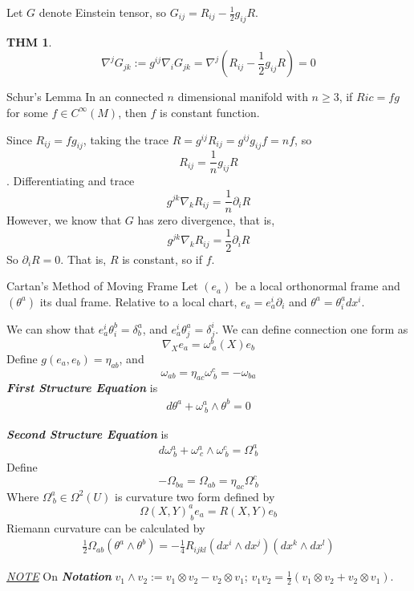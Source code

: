 \documentclass[twocolumn]{article}
\renewcommand{\emph}[1]{\textbf{\textit{#1}}}
\newcommand{\n}{\nabla}
\newcommand{\C}{C^{\infty}}
\newcommand{\p}{\partial}
\newcommand{\N}{\textit{\underline{NOTE} }}
\newcommand{\W}{\Omega}
\newtheorem{thm}{THM}
\theoremstyle{definition}
\begin{document}
Let $G$ denote Einstein tensor, so $G_{ij} = R_{ij} - \frac{1}{2}g_{ij}R$.

\begin{thm}
	$$
\n ^{j} G_{jk} := g^{ij}\n_{i} G_{jk} = \n^j(R_{ij} - \frac{1}{2}g_{ij}R)= 0
	$$
\end{thm}

\begin{eg}{Schur's Lemma}{}
	In an connected $n$ dimensional manifold with $n \geq 3$, if $Ric = fg$ for some $f \in \C(M)$, then $f$ is constant function.

	\tcblower
	Since $R_{ij} = fg_{ij}$, taking the trace $R = g^{ij}R_{ij} = g^{ij}g_{ij}f = nf$, so 
	$$R_{ij} = \frac{1}{n} g_{ij} R$$.
	Differentiating and trace 
	$$
		g^{jk} \n_{k}R_{ij} = \frac{1}{n} \p_i R 
	$$
	However, we know that $G$ has zero divergence, that is, 
	$$
		g^{jk} \n_{k}R_{ij} = \frac{1}{2} \p_i R 
	$$
	So $\p_i R = 0$. That is, $R$ is constant, so if $f$.
\end{eg}

\begin{fthm}{Cartan's Method of Moving Frame}{}
	Let $(e_a)$ be a local orthonormal frame and $(\theta ^a)$ its dual frame.
	Relative to a local chart, $e_a = e^i_a \p_i$ and $\theta^a = \theta^a_i dx^i$.

	We can show that $e^i_a \theta^b_i = \delta^a_b$, and $e^i_a \theta^a_j = \delta^i_j$.
	We can define connection one form as 
	$$
	\n_X e_a= \omega^b_{\ a}(X) e_b
	$$
	Define $g(e_a, e_b) = \eta_{ab}$, and 
	$$
	\omega_{ab} = \eta_{ac} \omega^c_{\ b} = - \omega_{ba}
	$$
	\emph{First Structure Equation} is
	\begin{align}
		d \theta^a + \omega^a_{\ b} \wedge \theta^b = 0
	\end{align}

	\emph{Second Structure Equation} is
	\begin{align}
		d \omega^a_{\ b} + \omega^a_{\ c} \wedge \omega^c_{\ b} = \Omega^a_{\ b}
	\end{align}
	Define 
	$$
		- \W_{ba} = \W_{ab} = \eta_{ac}\W^c_{\ b} 
	$$
	Where $\W^a_{\ b} \in \W^2(U)$ is curvature two form defined by 
	$$
		\W(X,Y)^a_{\ b} e_a = R(X, Y) e_b
	$$
	Riemann curvature can be calculated by 
	\begin{align}
		\frac{1}{2} \W_{ab}(\theta^a \wedge \theta^b) = - \frac{1}{4} R_{ijkl}(dx^i \wedge dx^j)(dx^k \wedge dx^l)
	\end{align}
\end{fthm}

\N On \emph{Notation}
$v_1 \wedge v_2 := v_1 \otimes v_2 - v_2 \otimes v_1$; $v_1v_2 = \frac{1}{2}(v_1\otimes v_2 + v_2\otimes v_1)$.
\end{document}
